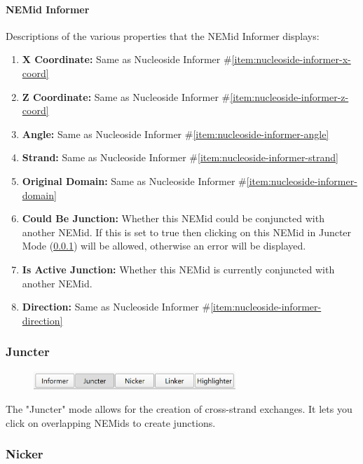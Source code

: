\documentclass[titlepage]{article}
\begin{document}
	\paragraph{NEMid Informer}
	Descriptions of the various properties that the NEMid Informer displays:
	\begin{enumerate}
		\item \textbf{X Coordinate:} Same as Nucleoside Informer \#\ref{item:nucleoside-informer-x-coord}
		\item \textbf{Z Coordinate:} Same as Nucleoside Informer \#\ref{item:nucleoside-informer-z-coord}
		\item \textbf{Angle:} Same as Nucleoside Informer \#\ref{item:nucleoside-informer-angle}
		\item \textbf{Strand:} Same as Nucleoside Informer \#\ref{item:nucleoside-informer-strand}
		\item \textbf{Original Domain:} Same as Nucleoside Informer \#\ref{item:nucleoside-informer-domain}
		\item \textbf{Could Be Junction:} Whether this NEMid could be conjuncted with another NEMid. If this is set to true then clicking on this NEMid in Juncter Mode (\ref{sect:juncter}) will be allowed, otherwise an error will be displayed.
		\item \textbf{Is Active Junction:} Whether this NEMid is currently conjuncted with another NEMid. 
		\item \textbf{Direction:} Same as Nucleoside Informer \#\ref{item:nucleoside-informer-direction}
	\end{enumerate}

	\subsubsection{Juncter} \label{sect:juncter}

	\begin{figure}[h]
		\centering
		\includegraphics[width=3in]{"juncter-activated.png"}
		\label{fig:juncter-activated}
	\end{figure}

	The "Juncter" mode allows for the creation of cross-strand exchanges. It lets you click on overlapping NEMids to create junctions.

	\subsubsection{Nicker}
\end{document}

